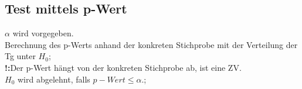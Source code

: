 \subsection{Test mittels p-Wert}
$ \alpha $ wird vorgegeben.\\
Berechnung des p-Werts anhand der konkreten Stichprobe mit der Verteilung der Tg unter $ H_{0}  $;\\
\textbf{!:}Der p-Wert hängt von der konkreten Stichprobe ab, ist eine ZV.\\
$ H_{0} $ wird abgelehnt, falls $ p-Wert \le \alpha. $;